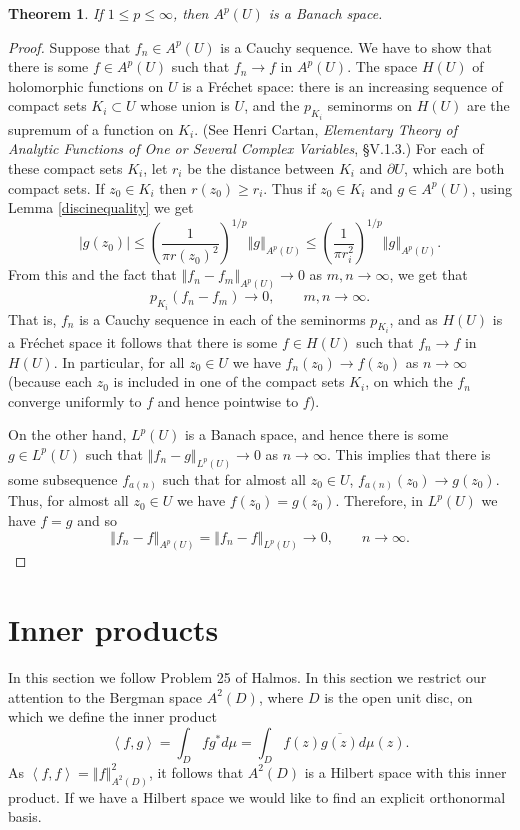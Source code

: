 \documentclass{article}
\newcommand{\inner}[2]{\left\langle #1, #2 \right\rangle}
\newcommand{\norm}[1]{\left\Vert #1 \right\Vert}
\newtheorem{theorem}{Theorem}
\begin{document}
\begin{theorem}
If $1 \leq p \leq \infty$, then $A^p(U)$ is a Banach space.
\label{bergmanbanach}
\end{theorem}
\begin{proof}
Suppose that $f_n \in A^p(U)$ is a Cauchy sequence. We have to show that there is some $f \in A^p(U)$ such that $f_n \to f$ in $A^p(U)$. The space $H(U)$ of holomorphic functions
on $U$ is a Fr\'echet space: there is an increasing sequence of compact sets $K_i \subset U$ whose union is $U$, and the $p_{K_i}$ seminorms on $H(U)$ are the supremum of a function
on $K_i$. (See Henri Cartan, {\em Elementary Theory of Analytic Functions of One or Several Complex Variables}, \S V.1.3.) For each of these compact sets $K_i$, 
let $r_i$ be the distance between $K_i$ and $\partial U$, which are both compact sets. If $z_0 \in K_i$ then
$r(z_0) \geq r_i$. Thus if  $z_0 \in K_i$ and  $g \in A^p(U)$, using Lemma \ref{discinequality} we get
\[
|g(z_0)| \leq \left(\frac{1}{\pi r(z_0)^2}\right)^{1/p} \norm{g}_{A^p(U)} \leq  \left(\frac{1}{\pi r_i^2}\right)^{1/p} \norm{g}_{A^p(U)}.
\]
From this and the fact that $\norm{f_n-f_m}_{A^p(U)} \to 0$ as $m,n \to \infty$, we get that
\[
p_{K_i}(f_n-f_m) \to 0, \qquad m,n \to \infty.
\]
That is, $f_n$ is a Cauchy sequence in each of the seminorms $p_{K_i}$, and as $H(U)$ is a Fr\'echet space it follows that there is some $f \in H(U)$ such that
$f_n \to f$ in $H(U)$. In particular, for all $z_0 \in U$ we have $f_n(z_0) \to f(z_0)$ as $n \to \infty$ (because each $z_0$ is included in one of the compact sets $K_i$, on which
the $f_n$ converge uniformly to $f$ and hence pointwise to $f$).

On the other hand, $L^p(U)$ is a Banach space, and hence there is some $g \in L^p(U)$ such that $\norm{f_n-g}_{L^p(U)} \to 0$ as $n \to \infty$.
This implies that there is some subsequence $f_{a(n)}$ such that 
for almost all $z_0 \in U$, $f_{a(n)}(z_0) \to g(z_0)$. Thus, for almost all $z_0 \in U$ we have $f(z_0)=g(z_0)$. Therefore, in $L^p(U)$ we have $f=g$ and so 
\[
\norm{f_n-f}_{A^p(U)} = \norm{f_n-f}_{L^p(U)} \to 0, \qquad n \to \infty.
\]
\end{proof}



\section{Inner products}
In this section we follow Problem 25 of Halmos.
In this section we restrict our attention to the Bergman space $A^2(D)$, where $D$ is the open unit disc,
on which we define the inner product
\[
\inner{f}{g}=\int_D f g^* d\mu = \int_D f(z) \overline{g(z)} d\mu(z).
\]
As $\inner{f}{f}=\norm{f}_{A^2(D)}^2$, it follows that $A^2(D)$ is a Hilbert space with this inner product. If we have a Hilbert space we would like to find an explicit orthonormal basis.
\end{document}
